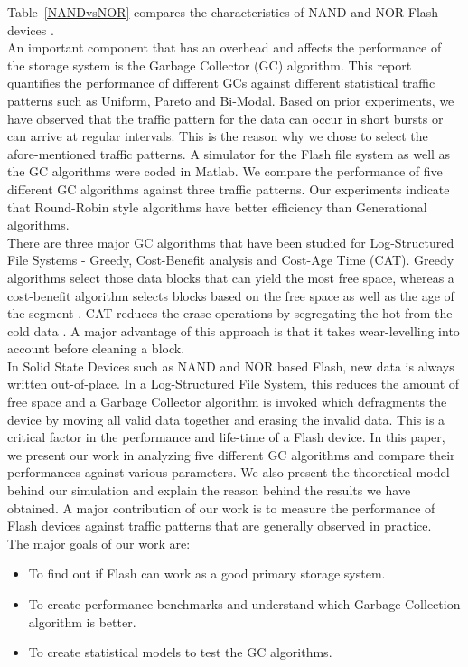 Table~\ref{NANDvsNOR} compares the characteristics of NAND and NOR Flash devices \cite{Toshiba}. 
\\

An important component that has an overhead and affects the performance of the storage system is the Garbage Collector (GC) algorithm. This report quantifies the performance of different GCs against different statistical traffic patterns such as Uniform, Pareto and Bi-Modal. Based on prior experiments, we have observed that the traffic pattern for the data can occur in short bursts or can arrive at regular intervals. This is the reason why we chose to select the afore-mentioned traffic patterns. A simulator for the Flash file system as well as the GC algorithms were coded in Matlab. We compare the performance of five different GC algorithms against three traffic patterns. Our experiments indicate that Round-Robin style algorithms have better efficiency than Generational algorithms.\\

There are three major GC algorithms that have been studied for Log-Structured File Systems - Greedy, Cost-Benefit analysis and Cost-Age Time (CAT). Greedy algorithms select those data blocks that can yield the most free space, whereas a cost-benefit algorithm selects blocks based on the free space as well as the age of the segment \cite{Menon98, Kwon07}. CAT reduces the erase operations by segregating the hot from the cold data \cite{Chiang99}. A major advantage of this approach is that it takes wear-levelling into account before cleaning a block. \\

In Solid State Devices such as NAND and NOR based Flash, new data is always written out-of-place. In a Log-Structured File System, this reduces the amount of free space and a Garbage Collector algorithm is invoked which defragments the device by moving all valid data together and erasing the invalid data. This is a critical factor in the performance and life-time of a Flash device. In this paper, we present our work in analyzing five different GC algorithms and compare their performances against various parameters. We also present the theoretical model behind our simulation and explain the reason behind the results we have obtained. A major contribution of our work is to measure the performance of Flash devices against traffic patterns that are generally observed in practice. \\
The major goals of our work are:
\begin{itemize}
\item To find out if Flash can work as a good primary storage system. 
\item To create performance benchmarks and understand which Garbage Collection algorithm is better. 
\item To create statistical models to test the GC algorithms.
\end{itemize}

